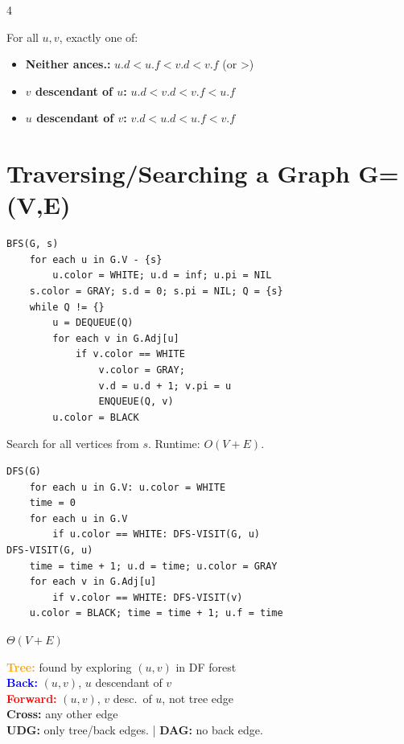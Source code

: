 \documentclass[8pt,a4paper,landscape]{extarticle}
\begin{document}
\begin{multicols*}{4}
\begin{thm}[title=Parenthesis theorem]
For all $u,v$, exactly one of:
\begin{itemize}
  \item \textbf{Neither ances.:} $u.d<u.f<v.d<v.f$ (or >)
  \item \textbf{$v$ descendant of $u$:} $u.d<v.d<v.f<u.f$
  \item \textbf{$u$ descendant of $v$:} $v.d<u.d<u.f<v.f$
\end{itemize}
\end{thm}

\section{Traversing/Searching a Graph G=(V,E)}

\begin{lstlisting}
BFS(G, s)
    for each u in G.V - {s}
        u.color = WHITE; u.d = inf; u.pi = NIL
    s.color = GRAY; s.d = 0; s.pi = NIL; Q = {s}
    while Q != {}
        u = DEQUEUE(Q)
        for each v in G.Adj[u]
            if v.color == WHITE
                v.color = GRAY;
                v.d = u.d + 1; v.pi = u
                ENQUEUE(Q, v)
        u.color = BLACK
\end{lstlisting}

\begin{prop}[title=BFS properties]
Search for all vertices from $s$. Runtime: $O(V+E)$.
\end{prop}

\begin{lstlisting}
DFS(G)
    for each u in G.V: u.color = WHITE
    time = 0
    for each u in G.V
        if u.color == WHITE: DFS-VISIT(G, u)
DFS-VISIT(G, u)
    time = time + 1; u.d = time; u.color = GRAY
    for each v in G.Adj[u]
        if v.color == WHITE: DFS-VISIT(v)
    u.color = BLACK; time = time + 1; u.f = time
\end{lstlisting}

\begin{prop}[title=Runtime]
$\Theta(V+E)$
\end{prop}

\begin{defn}[title=Classification of edges]
\textcolor{orange}{\textbf{Tree:}} found by exploring $(u,v)$ in DF forest\\
\textcolor{blue}{\textbf{Back:}} $(u,v)$, $u$ descendant of $v$\\
\textcolor{red}{\textbf{Forward:}} $(u,v)$, $v$ desc.\ of $u$, not tree edge\\
\textcolor{green!60!black}{\textbf{Cross:}} any other edge\\
\textbf{UDG:} only tree/back edges. | \textbf{DAG:} no back edge.
\end{defn}


\end{multicols*}
\end{document}
